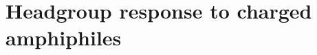 \documentclass[twoside,twocolumn,9pt]{article}
\begin{document}




\section{Headgroup response to charged amphiphiles}
\end{document}
